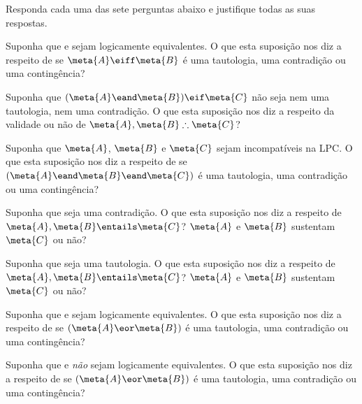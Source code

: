 \solutions
\problempart
\label{pr.TT.concepts}
Responda cada uma das sete perguntas abaixo e justifique todas as suas respostas.
\begin{earg}
\item Suponha que   e  sejam logicamente equivalentes.
O que esta suposição nos diz a respeito de se $\meta{A}\eiff\meta{B}$ é uma tautologia, uma contradição ou uma contingência?
\item Suponha que $(\meta{A}\eand\meta{B})\eif\meta{C}$ não seja nem uma tautologia, nem uma contradição.
O que esta suposição nos diz a respeito da validade ou não de $\meta{A}, \meta{B} \therefore\meta{C}$?
\item Suponha que  $\meta{A}$, $\meta{B}$ e $\meta{C}$ sejam incompatíveis na LPC.
O que esta suposição nos diz a respeito de se $(\meta{A}\eand\meta{B}\eand\meta{C})$ é uma tautologia, uma contradição ou uma contingência?
\item Suponha que  seja uma contradição.
O que esta suposição nos diz a respeito de $\meta{A}, \meta{B} \entails \meta{C}$?
$\meta{A}$ e $\meta{B}$ sustentam $\meta{C}$ ou não?
\item Suponha que  seja uma tautologia. 
O que esta suposição nos diz a respeito de $\meta{A}, \meta{B}\entails \meta{C}$?
$\meta{A}$ e $\meta{B}$ sustentam $\meta{C}$ ou não?
\item Suponha que  e  sejam logicamente equivalentes.
O que esta suposição nos diz a respeito de se $(\meta{A}\eor\meta{B})$ é uma tautologia, uma contradição ou uma contingência?
\item Suponha que   e  \emph{não} sejam logicamente equivalentes.
O que esta suposição nos diz a respeito de se $(\meta{A}\eor\meta{B})$ é uma tautologia, uma contradição ou uma contingência?
\end{earg}
